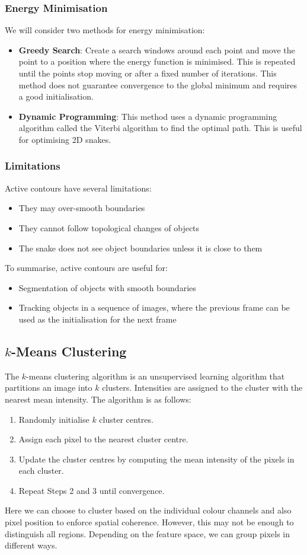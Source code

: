 \documentclass{article}
\begin{document}
\subsubsection{Energy Minimisation}
We will consider two methods for energy minimisation:
\begin{itemize}
    \item \textbf{Greedy Search}: Create a search windows around each
          point and move the point to a position where the energy function is
          minimised. This is repeated until the points stop moving or after
          a fixed number of iterations. This method does not guarantee
          convergence to the global minimum and requires a good initialisation.
    \item \textbf{Dynamic Programming}: This method uses a dynamic
          programming algorithm called the Viterbi algorithm to find the
          optimal path. This is useful for optimising 2D snakes.
\end{itemize}
\subsubsection{Limitations}
Active contours have several limitations:
\begin{itemize}
    \item They may over-smooth boundaries
    \item They cannot follow topological changes of objects
    \item The snake does not see object boundaries unless it is close
          to them
\end{itemize}
To summarise, active contours are useful for:
\begin{itemize}
    \item Segmentation of objects with smooth boundaries
    \item Tracking objects in a sequence of images, where the previous
          frame can be used as the initialisation for the next frame
\end{itemize}
\subsection{\texorpdfstring{\(k\)}{k}-Means Clustering}
The \(k\)-means clustering algorithm is an unsupervised learning
algorithm that partitions an image into \(k\) clusters. Intensities
are assigned to the cluster with the nearest mean intensity. The
algorithm is as follows:
\begin{enumerate}
    \item Randomly initialise \(k\) cluster centres.
    \item Assign each pixel to the nearest cluster centre.
    \item Update the cluster centres by computing the mean intensity of
          the pixels in each cluster.
    \item Repeat Steps 2 and 3 until convergence.
\end{enumerate}
Here we can choose to cluster based on the individual colour channels
and also pixel position to enforce spatial coherence. However, this may
not be enough to distinguish all regions. Depending on the feature space,
we can group pixels in different ways.
\end{document}
